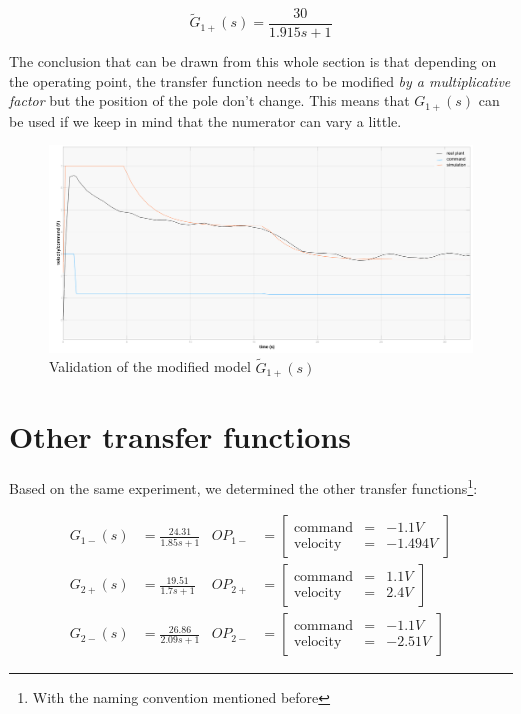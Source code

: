 \begin{equation}
    \tilde{G}_{1+}(s) = \frac{30}{1.915 s + 1}
\end{equation}

The conclusion that can be drawn from this whole section is that depending on the operating point, the transfer function
needs to be modified \textit{by a multiplicative factor} but the position of the pole don't change. This means that 
$G_{1+}(s)$ can be used if we keep in mind that the numerator can vary a little.

\begin{figure}[H]
    \centering
    \includegraphics[height=\textheight/3]{Pictures/validation_A0_30.png}
    \caption{Validation of the modified model $\tilde{G}_{1+}(s)$}
    \label{fig:validation_A0_30}
\end{figure}

\section{Other transfer functions}

Based on the same experiment, we determined the other transfer functions\footnote{With the naming convention mentioned 
before}:

\begin{align}
    G_{1-}(s) &= \frac{24.31}{1.85 s + 1} & OP_{1-} &= \begin{bmatrix}
                \text{command} & = & -1.1 V \\
                \text{velocity} & = & -1.494 V
                \end{bmatrix} 
    \label{TF_mot1_-} \\
    G_{2+}(s) &= \frac{19.51}{1.7 s + 1} & OP_{2+} &= \begin{bmatrix}
                \text{command} & = & 1.1 V \\
                \text{velocity} & = & 2.4 V
                \end{bmatrix} 
    \label{TF_mot2_+} \\
    G_{2-}(s) &= \frac{26.86}{2.09 s + 1} & OP_{2-} &= \begin{bmatrix}
                \text{command} & = & -1.1 V \\
                \text{velocity} & = & -2.51 V
                \end{bmatrix} 
    \label{TF_mot2_-}
\end{align}


